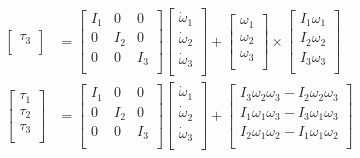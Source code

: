 \documentclass[titlepage]{article}
\begin{document}
\begin{equation}
\begin{split}
\begin{bmatrix}
			\tau_3 \\
		\end{bmatrix}
		&=
		\begin{bmatrix}
			I_1 & 0 & 0 \\
			0 & I_2 & 0 \\
			0 & 0 & I_3 \\
		\end{bmatrix}
		\begin{bmatrix}
			\dot{\omega}_1 \\
			\dot{\omega}_2 \\
			\dot{\omega}_3 \\
		\end{bmatrix}+
		\begin{bmatrix}
			\omega_1 \\
			\omega_2 \\
			\omega_3 \\
		\end{bmatrix}\times
		\begin{bmatrix}
			I_1\omega_1 \\
			I_2\omega_2 \\
			I_3\omega_3 \\
		\end{bmatrix} \\
		\begin{bmatrix}
			\tau_1 \\
			\tau_2 \\
			\tau_3 \\
		\end{bmatrix}
		&=
		\begin{bmatrix}
			I_1 & 0 & 0 \\
			0 & I_2 & 0 \\
			0 & 0 & I_3 \\
		\end{bmatrix}
		\begin{bmatrix}
			\dot{\omega}_1 \\
			\dot{\omega}_2 \\
			\dot{\omega}_3 \\
		\end{bmatrix}+
		\begin{bmatrix}
			I_3\omega_2\omega_3 - I_2\omega_2\omega_3 \\
			I_1\omega_1\omega_3 - I_3\omega_1\omega_3 \\
			I_2\omega_1\omega_2 - I_1\omega_1\omega_2 \\
		\end{bmatrix} \\

\end{split}
\end{equation}
\end{document}
